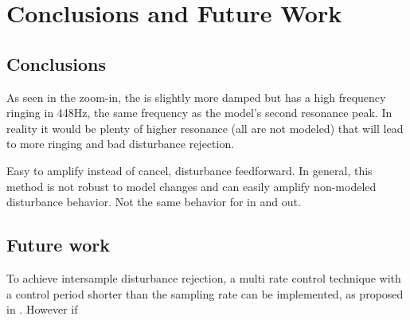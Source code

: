 \chapter{Conclusions and Future Work}\label{cha:conclusion}

\section{Conclusions}

As seen in the zoom-in, the \abbrIRC is slightly more damped but has a high frequency ringing in 448Hz, the same frequency as the model's second resonance peak. In reality it would be plenty of  higher resonance (all are not modeled) that will lead to more ringing and bad disturbance rejection.

Easy to amplify instead of cancel, disturbance feedforward.  In general, this method is not robust to model changes and can easily amplify non-modeled disturbance behavior. Not the same behavior for in and out. 


\section{Future work}

To achieve intersample disturbance rejection, a multi rate control technique with a control period shorter than the sampling rate can be implemented, as proposed in \citep{fujimoto2009rro}. However if
